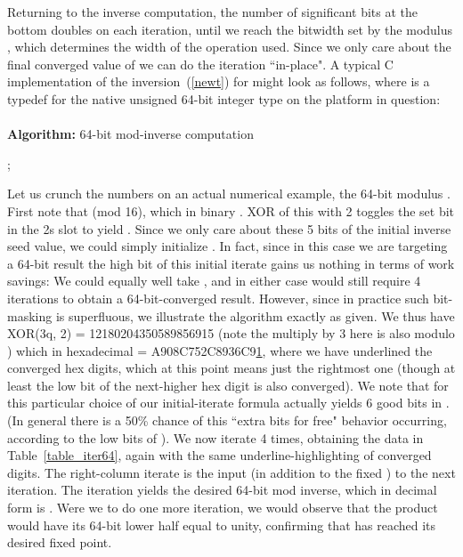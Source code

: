 \documentclass{article}
\begin{document}
Returning to the inverse computation, the number of significant bits at the bottom doubles on each iteration, until we reach the bitwidth set by the modulus , which determines the width of the  operation used. Since we only care about the final converged value of  we can do the iteration ``in-place". A typical C implementation of the inversion~(\ref{newt}) for  might look as follows, where  is a typedef for the native unsigned 64-bit integer type on the platform in question:\\
\\
{\bf Algorithm:} {64-bit mod-inverse computation}\\
\begin{algorithm}[H]
\vspace{0.1in}
	{
	;\\
	\For { \KwTo }{
		;\\
		;\\
	}
}
\end{algorithm}
\vspace{0.2in}
Let us crunch the numbers on an actual numerical example, the 64-bit modulus . First note that  (mod 16), which in binary . XOR of this with 2 toggles the set bit in the 2s slot to yield . Since we only care about these 5 bits of the initial inverse seed value, we could simply initialize . In fact, since in this case we are targeting a 64-bit result the high bit of this initial iterate gains us nothing in terms of work savings: We could equally well take , and in either case would still require 4 iterations to obtain a 64-bit-converged result. However, since in practice such bit-masking is superfluous, we illustrate the algorithm exactly as given. We thus have XOR(3q, 2) = 12180204350589856915 (note the multiply by 3 here is also modulo ) which in hexadecimal = A908C752C8936C9\underline{1}, where we have underlined the converged hex digits, which at this point means just the rightmost one (though at least the low bit of the next-higher hex digit is also converged). We note that for this particular choice of  our initial-iterate formula actually yields 6 good bits in . (In general there is a 50\% chance of this ``extra bits for free" behavior occurring, according to the low bits of ). We now iterate 4 times, obtaining the data in Table~\ref{table_iter64}, again with the same underline-highlighting of converged digits. The right-column iterate  is the input (in addition to the fixed ) to the next iteration. The iteration yields the desired 64-bit mod inverse, which in decimal form is . Were we to do one more iteration, we would observe that the product  would have its 64-bit lower half equal to unity, confirming that  has reached its desired fixed point.
\end{document}

